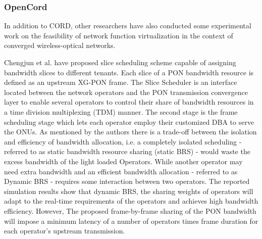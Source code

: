 









\subsubsection{OpenCord}

In addition to CORD, other researchers have also conducted some experimental work on the feasibility of network function virtualization in the context of converged wireless-optical networks.




Chengjun et al. \cite{7744444,7876161} have proposed slice scheduling scheme capable of assigning bandwidth slices to different tenants. Each slice of a \ac{PON} bandwidth resource is defined as an upstream XG-PON frame. The Slice Scheduler is an interface located between the network operators and the \ac{PON} transmission convergence layer to enable several operators to control their share of bandwidth resources in a time division multiplexing (TDM) manner. The second stage is the frame scheduling stage which lets each operator employ their customized \ac{DBA} to serve the \acp{ONU}. As mentioned by the authors there is a trade-off between the isolation and efficiency of bandwidth allocation, i.e. a completely isolated scheduling - referred to as static bandwidth resource sharing (static BRS) - would waste the excess bandwidth of the light loaded Operators. While another operator may need extra bandwidth and an efficient bandwidth allocation - referred to as Dynamic BRS - requires some interaction between two operators. The reported simulation results show that dynamic BRS, the sharing weights of operators will adapt to the real-time requirements of the operators and achieves high bandwidth efficiency.
However, The proposed frame-by-frame sharing of the \ac{PON} bandwidth will impose a minimum latency of a number of operators times frame duration for each operator's upstream transmission.

